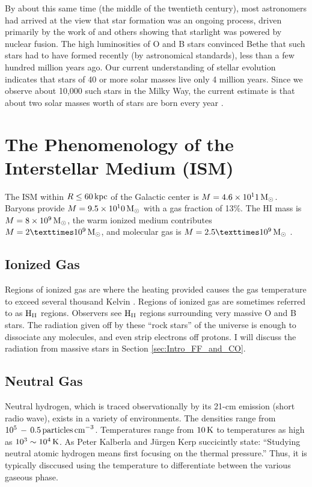 \documentclass[../dissertation.tex]{subfiles}
\begin{document}
By about this same time (the middle of the twentieth century), most astronomers had arrived at the view that star formation was an ongoing process, 
driven primarily by the work of \citet{1939PhRv...55..434B}
and others showing that starlight was powered by nuclear fusion. 
The high luminosities of O and B stars convinced Bethe that such stars had to have formed recently (by astronomical standards), less than a few hundred million years ago. 
Our current understanding of stellar evolution indicates that stars of 40 or more solar masses live only 4 million years. 
Since we observe about 10,000 such stars in the Milky Way, the current estimate is that about two solar masses worth of stars are born every year \citep{2011AJ....142..197C}. 

\section{The Phenomenology of the Interstellar Medium (ISM)}
The ISM within $R \le 60 \,\rm kpc$ of the Galactic center is $M = 4.6 \times 10^11 {\,\rm M}_\odot$. 
Baryons provide $M = 9.5 \times 10^10 {\,\rm M}_\odot$ with a gas fraction of 13\%. 
The HI mass is $M = 8 \times 10^9 {\,\rm M}_\odot$, the warm ionized medium contributes $M = 2 × 10^9 \Msun$, and molecular gas is $M = 2.5 × 10^9 \Msun$ \citep[p. 35]{2009ARA&A..47...27K}.

\subsection{Ionized Gas}
Regions of ionized gas are where the heating provided causes the gas temperature to exceed several thousand Kelvin \citep[p. 47]{2009ARA&A..47...27K}.
Regions of ionized gas are sometimes referred to as ${\rm H}_{\rm II}$ regions. 
Observers see ${\rm H}_{\rm II}$ regions surrounding very massive O and B stars. 
The radiation given off by these ``rock stars'' of the universe is enough to dissociate any molecules, and even strip electrons off protons. 
I will discuss the radiation from massive stars in Section \ref{sec:Intro_FF_and_CO}.

\subsection{Neutral Gas}
Neutral hydrogen, which is traced observationally by its 21-cm emission (short radio wave), exists in a variety of environments. 
The densities range from $10^5 \,  - \, 0.5 \, {\rm particles \, cm}^{-3}$.
Temperatures range from $10 \, {\rm K}$ to temperatures as high as $10^3 \sim 10^4 \, {\rm K}$. 
As Peter Kalberla and J{\"u}rgen Kerp succicintly state: 
``Studying neutral atomic hydrogen means first focusing on the thermal pressure.'' \citep[p. 47]{2009ARA&A..47...27K}
Thus, it is typically disccused using the temperature to differentiate between the various gaseous phase. %
\end{document}
